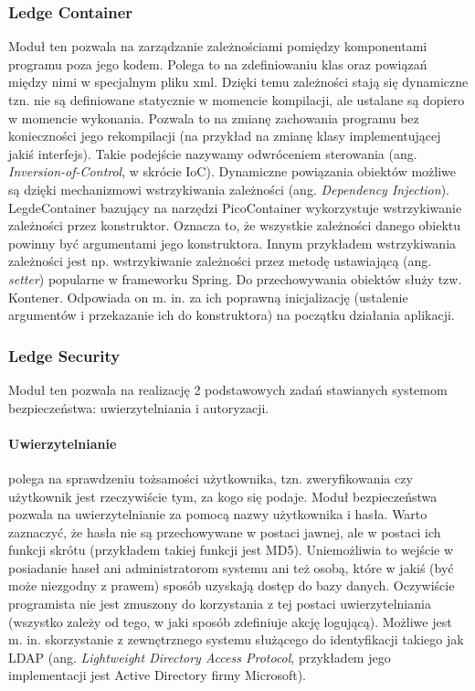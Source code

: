 \subsubsection{Ledge Container}
Moduł ten pozwala na zarządzanie zależnościami pomiędzy komponentami programu poza jego kodem. Polega to na zdefiniowaniu klas oraz powiązań między nimi w specjalnym pliku xml. Dzięki temu zależności stają się dynamiczne tzn. nie są definiowane statycznie w momencie kompilacji, ale ustalane są dopiero w momencie wykonania. Pozwala to na zmianę zachowania programu bez konieczności jego rekompilacji (na przykład na zmianę klasy implementującej jakiś interfejs). Takie podejście nazywamy odwróceniem sterowania (ang. \textit{Inversion-of-Control}, w skrócie IoC). Dynamiczne powiązania obiektów możliwe są dzięki mechanizmowi wstrzykiwania zależności (ang. \textit{Dependency Injection}). LegdeContainer bazujący na narzędzi PicoContainer wykorzystuje wstrzykiwanie zależności przez konstruktor. Oznacza to, że wszystkie zależności danego obiektu powinny być argumentami jego konstruktora. Innym przykładem wstrzykiwania zależności jest np. wstrzykiwanie zależności przez metodę ustawiającą (ang. \textit{setter}) popularne w frameworku Spring. Do przechowywania obiektów służy tzw. Kontener. Odpowiada on m. in. za ich poprawną inicjalizację (ustalenie argumentów i przekazanie ich do konstruktora) na początku działania aplikacji.

\subsubsection{Ledge Security}
\label{security}
Moduł ten pozwala na realizację 2 podstawowych zadań stawianych systemom bezpieczeństwa: uwierzytelniania i autoryzacji.

\paragraph{Uwierzytelnianie} polega na sprawdzeniu tożsamości użytkownika, tzn. zweryfikowania czy użytkownik jest rzeczywiście tym, za kogo się podaje. Moduł bezpieczeństwa pozwala na uwierzytelnianie za pomocą nazwy użytkownika i hasła. Warto zaznaczyć, że hasła nie są przechowywane w postaci jawnej, ale w postaci ich funkcji skrótu (przykładem takiej funkcji jest MD5). Uniemożliwia to wejście w posiadanie haseł ani administratorom systemu ani też osobą, które w jakiś (być może niezgodny z prawem) sposób uzyskają dostęp do bazy danych. Oczywiście programista nie jest zmuszony do korzystania z tej postaci uwierzytelniania (wszystko zależy od tego, w jaki sposób zdefiniuje akcję logującą). Możliwe jest m. in. skorzystanie z zewnętrznego systemu służącego do identyfikacji takiego jak LDAP (ang. \textit{Lightweight Directory Access Protocol}, przykładem jego implementacji jest Active Directory firmy Microsoft).

